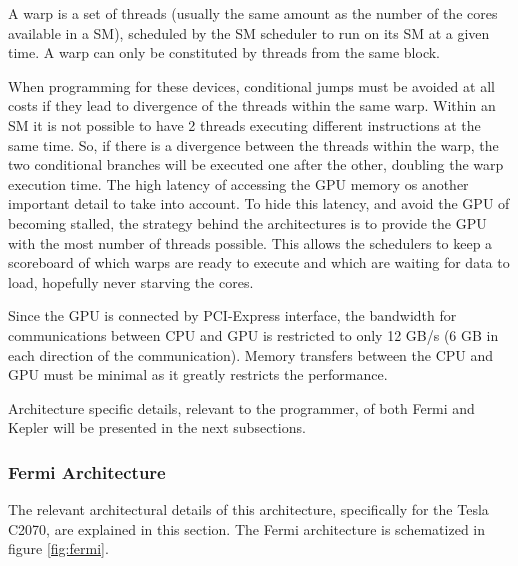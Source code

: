 A warp is a set of \cuda threads (usually the same amount as the number of the \cuda cores available in a SM), scheduled by the SM scheduler to run on its SM at a given time. A warp can only be constituted by \cuda threads from the same block.

When programming for these devices, conditional jumps must be avoided at all costs if they lead to divergence of the \cuda threads within the same warp. Within an SM it is not possible to have 2 threads executing different instructions at the same time. So, if there is a divergence between the threads within the warp, the two conditional branches will be executed one after the other, doubling the warp execution time. The high latency of accessing the GPU memory os another important detail to take into account. To hide this latency, and avoid the GPU of becoming stalled, the strategy behind the \nvidia architectures is to provide the GPU with the most number of \cuda threads possible. This allows the schedulers to keep a scoreboard of which warps are ready to execute and which are waiting for data to load, hopefully never starving the \cuda cores.

Since the GPU is connected by PCI-Express interface, the bandwidth for communications between CPU and GPU is restricted to only 12 GB/s (6 GB in each direction of the communication). Memory transfers between the CPU and GPU must be minimal as it greatly restricts the performance.

Architecture specific details, relevant to the programmer, of both Fermi and Kepler will be presented in the next subsections.

\subsubsection{\nvidia Fermi Architecture}

The relevant architectural details of this architecture, specifically for the Tesla C2070, are explained in this section. The Fermi architecture is schematized in figure \ref{fig:fermi}.

